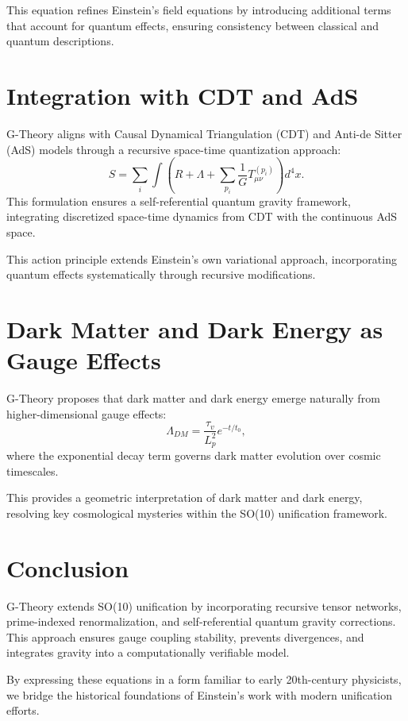 \documentclass{article}
\begin{document}
This equation refines Einstein's field equations by introducing additional terms that account for quantum effects, ensuring consistency between classical and quantum descriptions.

\section{Integration with CDT and AdS}
G-Theory aligns with Causal Dynamical Triangulation (CDT) and Anti-de Sitter (AdS) models through a recursive space-time quantization approach:
\begin{equation}
    S = \sum_{i} \int \left( R + \Lambda + \sum_{p_i} \frac{1}{G} T_{\mu\nu}^{(p_i)} \right) d^4x.
\end{equation}
This formulation ensures a self-referential quantum gravity framework, integrating discretized space-time dynamics from CDT with the continuous AdS space.

This action principle extends Einstein’s own variational approach, incorporating quantum effects systematically through recursive modifications.

\section{Dark Matter and Dark Energy as Gauge Effects}
G-Theory proposes that dark matter and dark energy emerge naturally from higher-dimensional gauge effects:
\begin{equation}
    \Lambda_{DM} = \frac{\tau_v}{L_p^2} e^{-t/t_0},
\end{equation}
where the exponential decay term governs dark matter evolution over cosmic timescales.

This provides a geometric interpretation of dark matter and dark energy, resolving key cosmological mysteries within the SO(10) unification framework.

\section{Conclusion}
G-Theory extends SO(10) unification by incorporating recursive tensor networks, prime-indexed renormalization, and self-referential quantum gravity corrections. This approach ensures gauge coupling stability, prevents divergences, and integrates gravity into a computationally verifiable model.

By expressing these equations in a form familiar to early 20th-century physicists, we bridge the historical foundations of Einstein’s work with modern unification efforts.





\printglossary
\end{document}
